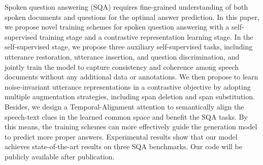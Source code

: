 Spoken question answering (SQA) requires fine-grained understanding of both spoken documents and  questions for the optimal answer prediction. In this paper, we propose novel training schemes  for spoken question answering with a self-supervised training stage and a contrastive representation learning stage. In the self-supervised stage, we propose three auxiliary self-supervised tasks, including utterance restoration, utterance insertion, and question discrimination, and jointly train the model to capture consistency and coherence among speech documents without any additional data or annotations. We then propose to learn noise-invariant utterance representations in a contrastive objective by adopting multiple augmentation strategies, including span deletion and span substitution. Besides, we design a Temporal-Alignment attention to semantically align the speech-text clues in the learned common space and benefit the SQA tasks. By this means, the training schemes can more effectively guide the generation model to predict more proper answers. Experimental results show that our model achieves state-of-the-art results on three SQA benchmarks. Our code will be publicly available after publication.
